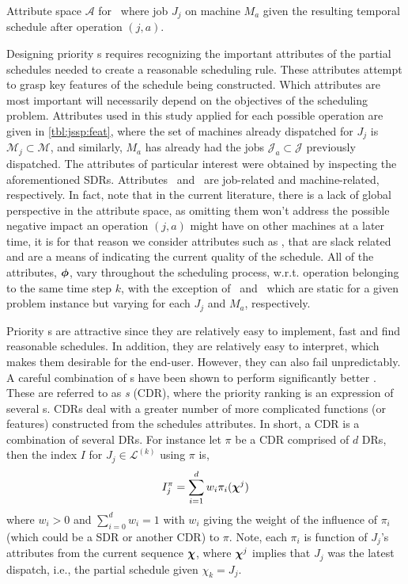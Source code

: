 \documentclass[smallextended]{svjour3}
\begin{document}
\begin{table}[t!] \centering
	\caption[Attribute space $\mathcal{A}$ for \JSP]{Attribute space 
	$\mathcal{A}$ for \JSP\ where job $J_j$ on machine $M_a$ given the 
	resulting temporal schedule after operation $(j,a)$.
	}
	\label{tbl:jssp:feat}
	
\end{table}

Designing priority \dr s requires recognizing the important 
attributes of the partial schedules needed to create a reasonable scheduling rule. 
These attributes attempt to grasp key features of the schedule being 
constructed. Which attributes are most important will necessarily depend on the
objectives of the scheduling problem. 
Attributes used in this study applied for 
each possible operation are given in \cref{tbl:jssp:feat}, where the set of 
machines already dispatched for $J_j$ is $\mathcal{M}_j\subset\mathcal{M}$, 
and similarly, $M_a$ has already had the jobs $\mathcal{J}_a\subset\mathcal{J}$ 
previously dispatched.
The attributes of particular interest were obtained by inspecting the 
aforementioned SDRs. Attributes \phiJobRelated\ and \phiMacRelated\ are 
job-related and machine-related, respectively.
In fact, \cite{Pickardt2013} note that in the current literature, there is a 
lack of global perspective in the attribute space, as omitting them won't 
address the possible negative impact an operation $(j,a)$ might have on other 
machines at a later time, it is for that reason we consider attributes such as 
\phiSlackRelated, that are slack related and are a means of indicating the 
current quality of the schedule.
All of the attributes, $\bm{\phi}$, vary throughout the scheduling process, 
w.r.t. operation belonging to the same time step $k$, with the exception of 
\phijobTotProcTime\ and \phimacTotProcTime\ which are static for a given 
problem instance but varying for each $J_j$ and $M_a$, respectively. 

Priority \dr s are attractive since they are relatively easy to 
implement, fast and find reasonable schedules. In addition, they are relatively 
easy to interpret, which makes them desirable for the end-user.
However, they can also fail unpredictably. 
A careful combination of \dr s have been shown to perform significantly better 
\cite{Jayamohan04}. These are referred to as \emph{\cdr s} 
(CDR), where the priority ranking is an expression of several \dr s. 
CDRs deal with a greater number of more complicated functions (or features) 
constructed from the schedules attributes. In short, a CDR is a combination of 
several DRs. 
For instance let $\pi$ be a CDR comprised of $d$ DRs, then the index $I$ for 
$J_j\in\mathcal{L}^{(k)}$ using $\pi$ is, 
\begin{equation}	I_j^{\pi} = \sum_{i=1}^d w_i \pi_i(\bm \chi^j) 
    \label{eq:CDR}
\end{equation}
where $w_i>0$ and $\sum_{i=0}^d w_i = 1$ with $w_i$ giving the weight of the 
influence of $\pi_i$ (which could be a SDR or another CDR) to $\pi$. Note, 
each $\pi_i$ is function of $J_j$'s attributes from the current sequence 
$\bm \chi$, where $\bm \chi^j$ implies that $J_j$ was the latest dispatch, i.e., the 
partial schedule given $\chi_k=J_j$.
\end{document}
